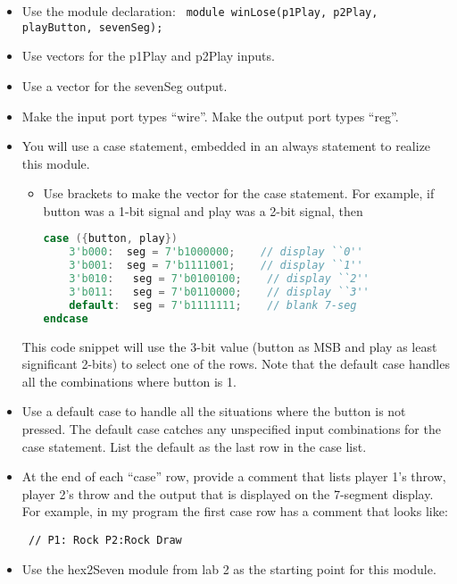 \begin{itemize}
    \item
        Use the module declaration:
        \verb+ module winLose(p1Play, p2Play, playButton, sevenSeg);+

    \item
        Use vectors for the p1Play and p2Play inputs.
    \item
        Use a vector for the sevenSeg output.
    \item
        Make the input port types ``wire''. Make the output port types  ``reg''.

    \item
        You will use a case statement, embedded in an always statement to
        realize this module.

        \begin{itemize}
            \item
                Use brackets to make the vector for the case statement. For example,
                if button was a 1-bit signal and play was a 2-bit signal, then

\begin{lstlisting}[language=Verilog, frame=single]
case ({button, play})
    3'b000:  seg = 7'b1000000;    // display ``0''
    3'b001:  seg = 7'b1111001;    // display ``1''
    3'b010:   seg = 7'b0100100;    // display ``2''
    3'b011:   seg = 7'b0110000;    // display ``3''
    default:  seg = 7'b1111111;    // blank 7-seg
endcase
    \end{lstlisting}

        \end{itemize}

        This code snippet will use the 3-bit value (button as MSB and play as
        least significant 2-bits) to select one of the rows. Note that the
        default case handles all the combinations where button is 1.

    \item
        Use a default case to handle all the situations
        where the button is not pressed. The default case catches any
        unspecified input combinations for the case statement. List the
        default as the last row in the case list.
    \item
        At the end of each ``case'' row, provide a comment that lists player
        1's throw, player 2's throw and the output that is displayed on the
        7-segment display. For example, in my program the first case row has a
        comment that looks like:

        \verb+ // P1: Rock P2:Rock Draw +

    \item
        Use the hex2Seven module from lab 2 as the starting point for this
        module.
\end{itemize}

